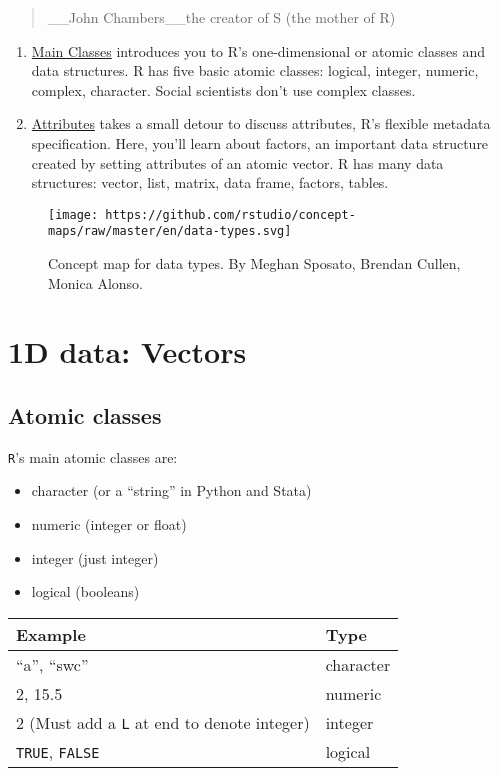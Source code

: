 \documentclass[
]{book}
\providecommand{\tightlist}{%
  \setlength{\itemsep}{0pt}\setlength{\parskip}{0pt}}
\begin{document}
\begin{quote}
\_\_John Chambers\_\_the creator of S (the mother of R)
\end{quote}

\begin{enumerate}
\def\labelenumi{\arabic{enumi}.}
\item
  \protect\hyperlink{main-classes}{Main Classes} introduces you to R's one-dimensional or atomic classes and data structures. R has five basic atomic classes: logical, integer, numeric, complex, character. Social scientists don't use complex classes.
\item
  \protect\hyperlink{attributes}{Attributes} takes a small detour to discuss attributes, R's flexible metadata specification. Here, you'll learn about factors, an important data structure created by setting attributes of an atomic vector. R has many data structures: vector, list, matrix, data frame, factors, tables.
\end{enumerate}

\begin{figure}
\centering
\texttt{[image: https://github.com/rstudio/concept-maps/raw/master/en/data-types.svg]}
\caption{Concept map for data types. By Meghan Sposato, Brendan Cullen, Monica Alonso.}
\end{figure}

\hypertarget{d-data-vectors}{%
\section{1D data: Vectors}\label{d-data-vectors}}

\hypertarget{atomic-classes}{%
\subsection{Atomic classes}\label{atomic-classes}}

\texttt{R}'s main atomic classes are:

\begin{itemize}
\tightlist
\item
  character (or a ``string'' in Python and Stata)
\item
  numeric (integer or float)
\item
  integer (just integer)
\item
  logical (booleans)
\end{itemize}

\begin{longtable}[]{@{}ll@{}}
\toprule
Example & Type \\
\midrule
\endhead
``a'', ``swc'' & character \\
2, 15.5 & numeric \\
2 (Must add a \texttt{L} at end to denote integer) & integer \\
\texttt{TRUE}, \texttt{FALSE} & logical \\
\bottomrule
\end{longtable}
\end{document}
